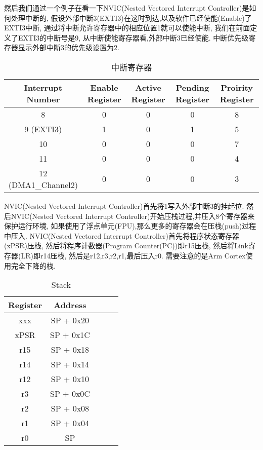 然后我们通过一个例子在看一下NVIC(Nested Vectored Interrupt Controller)是如何处理中断的,
假设外部中断3(EXTI3)在这时到达,以及软件已经使能(Enable)了EXTI3中断,
通过将中断允许寄存器中的相应位置1就可以使能中断,
我们在前面定义了EXTI3的中断号是9,
从中断使能寄存器看,外部中断3已经使能.
中断优先级寄存器显示外部中断3的优先级设置为2.
\begin{table}[htbp]
    \caption{  中断寄存器 }\label{tab:table1}
    \vspace{0.5em}\centering\wuhao
    \begin{tabular}{ccccc}
    \toprule[1.5pt]
    Interrupt Number & Enable Register & Active Register & Pending Register & Proirity Register \\
    \midrule[1pt]
    8 & 0 & 0 & 0 & 8 \\
    9 (EXTI3) & 1 & 0 & 1 & 5 \\
    10 & 0 & 0 & 0 & 7 \\
    11 & 0 & 0 & 0 & 4 \\
    12 (DMA1\_Channel2) & 0 & 0 & 0 & 3 \\
    \bottomrule[1.5pt]
    \end{tabular}
    \vspace{\baselineskip}
    \end{table}

NVIC(Nested Vectored Interrupt Controller)首先将1写入外部中断3的挂起位.
然后NVIC(Nested Vectored Interrupt Controller)开始压栈过程,并压入8个寄存器来保护运行环境,
如果使用了浮点单元(FPU),那么更多的寄存器会在压栈(push)过程中压入.
NVIC(Nested Vectored Interrupt Controller)首先将程序状态寄存器(xPSR)压栈,
然后将程序计数器(Program Counter(PC))即r15压栈,
然后将Link寄存器(LR)即r14压栈,
然后是r12,r3,r2,r1,最后压入r0.
需要注意的是Arm Cortex使用完全下降的栈.
\begin{table}[htbp]
    \caption{  Stack }\label{tab:table1}
    \vspace{0.5em}\centering\wuhao
    \begin{tabular}{ccccc}
    \toprule[1.5pt]
    Register & Address  \\
    \midrule[1pt]
    xxx &   SP + 0x20  \\
    xPSR &  SP + 0x1C  \\
    r15 &   SP + 0x18  \\
    r14 &   SP + 0x14  \\
    r12 &   SP + 0x10  \\
    r3 &    SP + 0x0C  \\
    r2 &    SP + 0x08 \\
    r1 &    SP + 0x04  \\
    r0 &    SP  \\
    \bottomrule[1.5pt]
    \end{tabular}
    \vspace{\baselineskip}
    \end{table}

